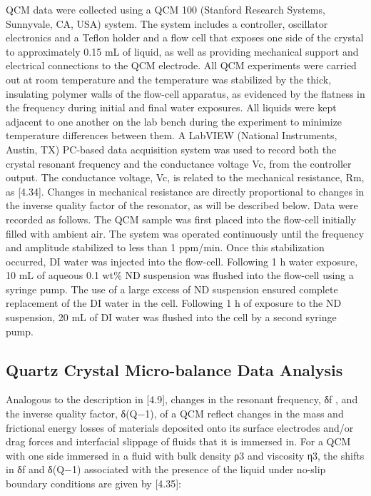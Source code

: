 QCM data were collected using a QCM 100 (Stanford Research Systems, Sunnyvale, CA, USA) system. The system includes a controller, oscillator electronics and a Teflon holder and a flow cell that exposes one side of the crystal to approximately 0.15 mL of liquid, as well as providing mechanical support and electrical connections to the QCM electrode. All QCM experiments were carried out at room temperature and the temperature was stabilized by the thick, insulating polymer walls of the flow-cell apparatus, as evidenced by the flatness in the frequency during initial and final water exposures. All liquids were kept adjacent to one another on the lab bench during the experiment to minimize temperature differences between them. A LabVIEW (National Instruments, Austin, TX) PC-based data acquisition system was used to record both the crystal resonant frequency and the conductance voltage Vc, from the controller output. The conductance voltage, Vc, is related to the mechanical resistance, Rm, as   [4.34]. Changes in mechanical resistance are directly proportional to changes in the inverse quality factor of the resonator, as will be described below.
Data were recorded as follows. The QCM sample was first placed into the flow-cell initially filled with ambient air. The system was operated continuously until the frequency and amplitude stabilized to less than 1 ppm/min. Once this stabilization occurred, DI water was injected into the flow-cell. Following 1 h water exposure, 10 mL of aqueous 0.1 wt\% ND suspension was flushed into the flow-cell using a syringe pump. The use of a large excess of ND suspension ensured complete replacement of the DI water in the cell. Following 1 h of exposure to the ND suspension, 20 mL of DI water was flushed into the cell by a second syringe pump.

\subsection{Quartz Crystal Micro-balance Data Analysis}

Analogous to the description in [4.9], changes in the resonant frequency, δf , and the inverse quality factor, δ(Q−1), of a QCM reflect changes in the mass and frictional energy losses of materials deposited onto its surface electrodes and/or drag forces and interfacial slippage of fluids that it is immersed in. For a QCM with one side immersed in a fluid with bulk density ρ3 and viscosity η3, the shifts in δf and δ(Q−1) associated with the presence of the liquid under no-slip boundary conditions are given by [4.35]:

